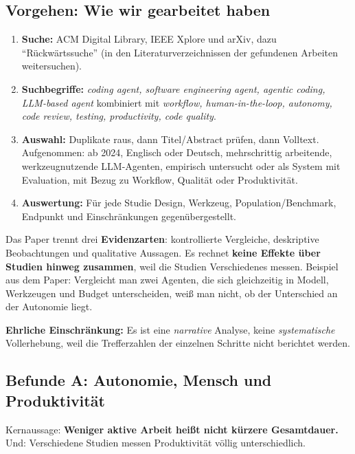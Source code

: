 \documentclass[11pt,a4paper,parskip=half]{scrartcl}
\begin{document}
\subsection{Vorgehen: Wie wir gearbeitet haben}
\begin{enumerate}
\item \textbf{Suche:} ACM Digital Library, IEEE Xplore und arXiv, dazu \enquote{Rückwärtssuche} (in den Literaturverzeichnissen der gefundenen Arbeiten weitersuchen).
\item \textbf{Suchbegriffe:} \emph{coding agent, software engineering agent, agentic coding, LLM-based agent} kombiniert mit \emph{workflow, human-in-the-loop, autonomy, code review, testing, productivity, code quality}.
\item \textbf{Auswahl:} Duplikate raus, dann Titel/Abstract prüfen, dann Volltext. Aufgenommen: ab 2024, Englisch oder Deutsch, mehrschrittig arbeitende, werkzeugnutzende LLM-Agenten, empirisch untersucht oder als System mit Evaluation, mit Bezug zu Workflow, Qualität oder Produktivität.
\item \textbf{Auswertung:} Für jede Studie Design, Werkzeug, Population/Benchmark, Endpunkt und Einschränkungen gegenübergestellt.
\end{enumerate}

\begin{merke}
Das Paper trennt drei \textbf{Evidenzarten}: kontrollierte Vergleiche, deskriptive Beobachtungen und qualitative Aussagen. Es rechnet \textbf{keine Effekte über Studien hinweg zusammen}, weil die Studien Verschiedenes messen. Beispiel aus dem Paper: Vergleicht man zwei Agenten, die sich gleichzeitig in Modell, Werkzeugen und Budget unterscheiden, weiß man nicht, ob der Unterschied an der Autonomie liegt.
\end{merke}

\textbf{Ehrliche Einschränkung:} Es ist eine \emph{narrative} Analyse, keine \emph{systematische} Vollerhebung, weil die Trefferzahlen der einzelnen Schritte nicht berichtet werden.

\subsection{Befunde A: Autonomie, Mensch und Produktivität}
Kernaussage: \textbf{Weniger aktive Arbeit heißt nicht kürzere Gesamtdauer.} Und: Verschiedene Studien messen Produktivität völlig unterschiedlich.
\end{document}

